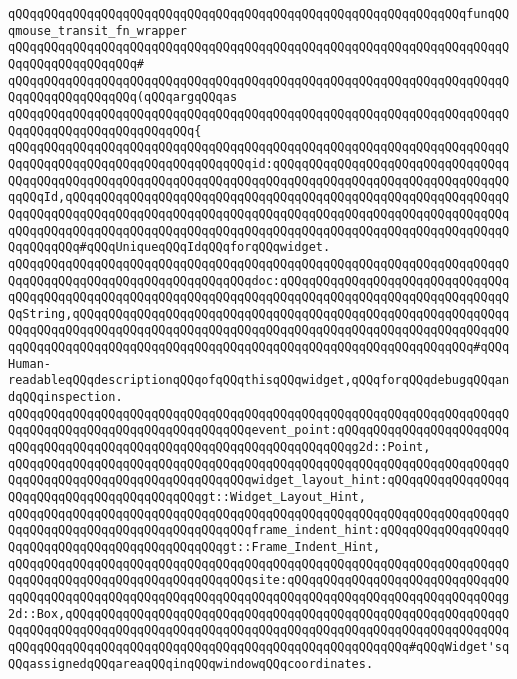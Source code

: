 \newline
\verb|qQQqqQQqqQQqqQQqqQQqqQQqqQQqqQQqqQQqqQQqqQQqqQQqqQQqqQQqqQQqqQQqfunqQQqmouse_transit_fn_wrapper|\newline
\verb|qQQqqQQqqQQqqQQqqQQqqQQqqQQqqQQqqQQqqQQqqQQqqQQqqQQqqQQqqQQqqQQqqQQqqQQqqQQqqQQqqQQqqQQq#|\newline
\verb|qQQqqQQqqQQqqQQqqQQqqQQqqQQqqQQqqQQqqQQqqQQqqQQqqQQqqQQqqQQqqQQqqQQqqQQqqQQqqQQqqQQqqQQq(qQQqargqQQqas|\newline
\verb|qQQqqQQqqQQqqQQqqQQqqQQqqQQqqQQqqQQqqQQqqQQqqQQqqQQqqQQqqQQqqQQqqQQqqQQqqQQqqQQqqQQqqQQqqQQqqQQq{|\newline
\verb|qQQqqQQqqQQqqQQqqQQqqQQqqQQqqQQqqQQqqQQqqQQqqQQqqQQqqQQqqQQqqQQqqQQqqQQqqQQqqQQqqQQqqQQqqQQqqQQqqQQqqQQqid:qQQqqQQqqQQqqQQqqQQqqQQqqQQqqQQqqQQqqQQqqQQqqQQqqQQqqQQqqQQqqQQqqQQqqQQqqQQqqQQqqQQqqQQqqQQqqQQqqQQqqQQqqQQqId,qQQqqQQqqQQqqQQqqQQqqQQqqQQqqQQqqQQqqQQqqQQqqQQqqQQqqQQqqQQqqQQqqQQqqQQqqQQqqQQqqQQqqQQqqQQqqQQqqQQqqQQqqQQqqQQqqQQqqQQqqQQqqQQqqQQqqQQqqQQqqQQqqQQqqQQqqQQqqQQqqQQqqQQqqQQqqQQqqQQqqQQqqQQqqQQqqQQqqQQqqQQqqQQqqQQq#qQQqUniqueqQQqIdqQQqforqQQqwidget.|\newline
\verb|qQQqqQQqqQQqqQQqqQQqqQQqqQQqqQQqqQQqqQQqqQQqqQQqqQQqqQQqqQQqqQQqqQQqqQQqqQQqqQQqqQQqqQQqqQQqqQQqqQQqqQQqdoc:qQQqqQQqqQQqqQQqqQQqqQQqqQQqqQQqqQQqqQQqqQQqqQQqqQQqqQQqqQQqqQQqqQQqqQQqqQQqqQQqqQQqqQQqqQQqqQQqqQQqqQQqString,qQQqqQQqqQQqqQQqqQQqqQQqqQQqqQQqqQQqqQQqqQQqqQQqqQQqqQQqqQQqqQQqqQQqqQQqqQQqqQQqqQQqqQQqqQQqqQQqqQQqqQQqqQQqqQQqqQQqqQQqqQQqqQQqqQQqqQQqqQQqqQQqqQQqqQQqqQQqqQQqqQQqqQQqqQQqqQQqqQQqqQQqqQQqqQQqqQQq#qQQqHuman-readableqQQqdescriptionqQQqofqQQqthisqQQqwidget,qQQqforqQQqdebugqQQqandqQQqinspection.|\newline
\verb|qQQqqQQqqQQqqQQqqQQqqQQqqQQqqQQqqQQqqQQqqQQqqQQqqQQqqQQqqQQqqQQqqQQqqQQqqQQqqQQqqQQqqQQqqQQqqQQqqQQqqQQqevent_point:qQQqqQQqqQQqqQQqqQQqqQQqqQQqqQQqqQQqqQQqqQQqqQQqqQQqqQQqqQQqqQQqqQQqqQQqg2d::Point,|\newline
\verb|qQQqqQQqqQQqqQQqqQQqqQQqqQQqqQQqqQQqqQQqqQQqqQQqqQQqqQQqqQQqqQQqqQQqqQQqqQQqqQQqqQQqqQQqqQQqqQQqqQQqqQQqwidget_layout_hint:qQQqqQQqqQQqqQQqqQQqqQQqqQQqqQQqqQQqqQQqqQQqgt::Widget_Layout_Hint,|\newline
\verb|qQQqqQQqqQQqqQQqqQQqqQQqqQQqqQQqqQQqqQQqqQQqqQQqqQQqqQQqqQQqqQQqqQQqqQQqqQQqqQQqqQQqqQQqqQQqqQQqqQQqqQQqframe_indent_hint:qQQqqQQqqQQqqQQqqQQqqQQqqQQqqQQqqQQqqQQqqQQqqQQqgt::Frame_Indent_Hint,|\newline
\verb|qQQqqQQqqQQqqQQqqQQqqQQqqQQqqQQqqQQqqQQqqQQqqQQqqQQqqQQqqQQqqQQqqQQqqQQqqQQqqQQqqQQqqQQqqQQqqQQqqQQqqQQqsite:qQQqqQQqqQQqqQQqqQQqqQQqqQQqqQQqqQQqqQQqqQQqqQQqqQQqqQQqqQQqqQQqqQQqqQQqqQQqqQQqqQQqqQQqqQQqqQQqqQQqg2d::Box,qQQqqQQqqQQqqQQqqQQqqQQqqQQqqQQqqQQqqQQqqQQqqQQqqQQqqQQqqQQqqQQqqQQqqQQqqQQqqQQqqQQqqQQqqQQqqQQqqQQqqQQqqQQqqQQqqQQqqQQqqQQqqQQqqQQqqQQqqQQqqQQqqQQqqQQqqQQqqQQqqQQqqQQqqQQqqQQqqQQqqQQqqQQq#qQQqWidget'sqQQqassignedqQQqareaqQQqinqQQqwindowqQQqcoordinates.|\newline
